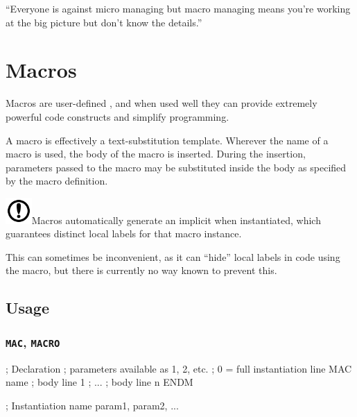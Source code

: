 \begin{savequote}
\sffamily
``Everyone is against micro managing but macro managing means you're working at the big picture but don't know the details.''
\end{savequote}

\chapter{Macros}
\label{macros}

Macros are user-defined , and when used well they can provide extremely powerful code constructs and simplify programming.

A macro is effectively a text-substitution template. Wherever the name of a macro is used, the body of the macro is inserted. During the insertion, parameters passed to the macro may be substituted inside the body as specified by the macro definition.

\includegraphics[width=1cm]{important}Macros automatically generate an implicit  when instantiated, which guarantees distinct local labels for that macro instance.

This can sometimes be inconvenient, as it can ``hide'' local labels in code using the macro, but there is currently no way known to prevent this.

\section{Usage}

\subsection{\texttt{MAC}, \texttt{MACRO}}
\label{pseudoop:mac}
\label{pseudoop:macro}

\begin{usage}
; Declaration
; parameters available as {1}, {2}, etc.
; {0} = full instantiation line
  MAC name
    ; body line 1
    ; ...
    ; body line n
  ENDM
\end{usage}

\begin{usage}
; Instantiation
  name param1, param2, ...
\end{usage}
	
